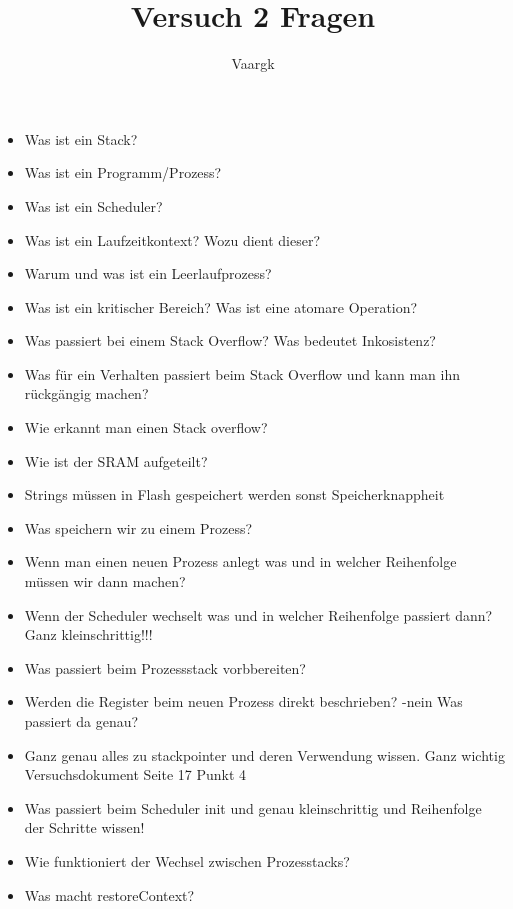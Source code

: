 \documentclass[12pt]{article}
\title{Versuch 2 Fragen}
\author{
        Vaargk
}
\begin{document}
\maketitle

\begin{itemize}
\item Was ist ein Stack?
\item Was ist ein Programm/Prozess?
\item Was ist ein Scheduler?
\item Was ist ein Laufzeitkontext? Wozu dient dieser?
\item Warum und was ist ein Leerlaufprozess?
\item Was ist ein kritischer Bereich? Was ist eine atomare Operation?
\item Was passiert bei einem Stack Overflow? Was bedeutet Inkosistenz?
\item Was für ein Verhalten passiert beim Stack Overflow und kann man ihn rückgängig machen?
\item Wie erkannt man einen Stack overflow?
\item Wie ist der SRAM aufgeteilt?
\item Strings müssen in Flash gespeichert werden sonst Speicherknappheit
\item Was speichern wir zu einem Prozess?
\item Wenn man einen neuen Prozess anlegt was und in welcher Reihenfolge müssen wir dann machen?
\item Wenn der Scheduler wechselt was und in welcher Reihenfolge passiert dann? Ganz kleinschrittig!!!
\item Was passiert beim Prozessstack vorbbereiten?
\item Werden die Register beim neuen Prozess direkt beschrieben? -nein Was passiert da genau?
\item Ganz genau alles zu stackpointer und deren Verwendung wissen. Ganz wichtig Versuchsdokument Seite 17 Punkt 4
\item Was passiert beim Scheduler init und genau kleinschrittig und Reihenfolge der Schritte wissen!
\item Wie funktioniert der Wechsel zwischen Prozesstacks?
\item Was macht restoreContext?
\end{itemize}
\end{document}
